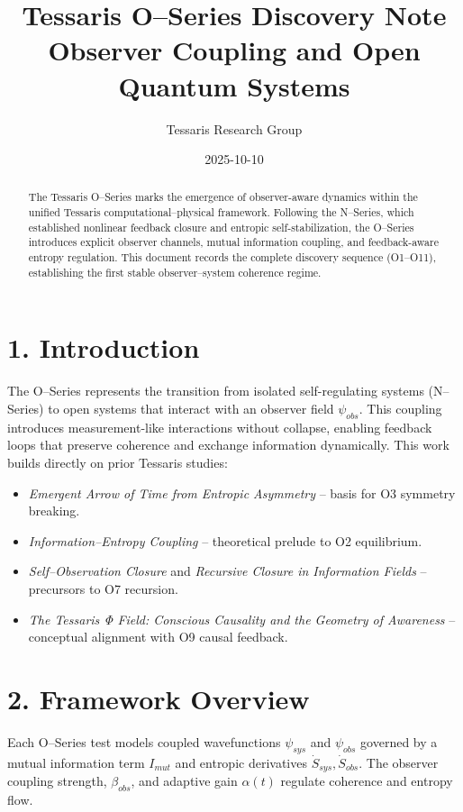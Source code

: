 \documentclass[12pt]{article}
\title{\textbf{Tessaris O–Series Discovery Note}\\
\large Observer Coupling and Open Quantum Systems}
\author{Tessaris Research Group}
\date{2025-10-10}
\begin{document}
\maketitle

\begin{abstract}
The Tessaris O–Series marks the emergence of observer-aware dynamics within the unified Tessaris computational–physical framework. 
Following the N–Series, which established nonlinear feedback closure and entropic self-stabilization, 
the O–Series introduces explicit observer channels, mutual information coupling, and feedback-aware entropy regulation. 
This document records the complete discovery sequence (O1–O11), establishing the first stable observer–system coherence regime.
\end{abstract}

\section*{1. Introduction}
The O–Series represents the transition from isolated self-regulating systems (N–Series) to open systems that interact with an observer field $\psi_{obs}$. 
This coupling introduces measurement-like interactions without collapse, enabling feedback loops that preserve coherence and exchange information dynamically.
This work builds directly on prior Tessaris studies:
\begin{itemize}
  \item \textit{Emergent Arrow of Time from Entropic Asymmetry} – basis for O3 symmetry breaking.
  \item \textit{Information–Entropy Coupling} – theoretical prelude to O2 equilibrium.
  \item \textit{Self–Observation Closure} and \textit{Recursive Closure in Information Fields} – precursors to O7 recursion.
  \item \textit{The Tessaris Φ Field: Conscious Causality and the Geometry of Awareness} – conceptual alignment with O9 causal feedback.
\end{itemize}

\section*{2. Framework Overview}
Each O–Series test models coupled wavefunctions $\psi_{sys}$ and $\psi_{obs}$ governed by a mutual information term $I_{mut}$ 
and entropic derivatives $\dot{S}_{sys}, \dot{S}_{obs}$. 
The observer coupling strength, $\beta_{obs}$, and adaptive gain $\alpha(t)$ regulate coherence and entropy flow.
\end{document}
